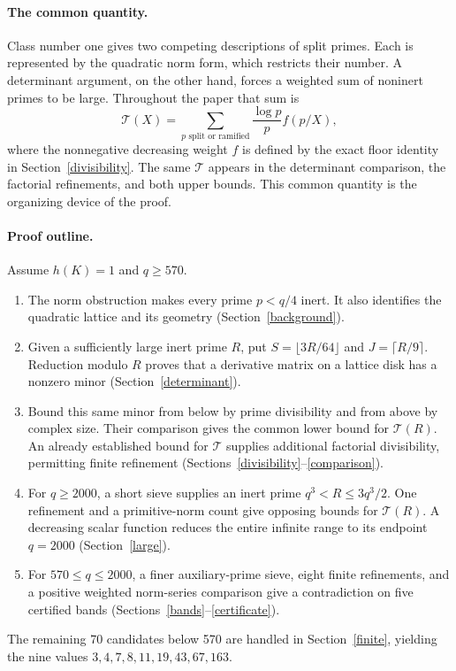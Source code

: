 \documentclass[11pt]{article}
\newcommand{\Tn}{\mathcal T}
\begin{document}
\paragraph{The common quantity.}
Class number one gives two competing descriptions of split primes.
Each is represented by the quadratic norm form, which restricts their
number. A determinant argument, on the other hand, forces a weighted
sum of noninert primes to be large. Throughout the paper that sum is
\[
 \Tn(X)=\sum_{p\text{ split or ramified}}\frac{\log p}{p}f(p/X),
\]
where the nonnegative decreasing weight \(f\) is defined by the exact
floor identity in Section~\ref{divisibility}. The same \(\Tn\) appears
in the determinant comparison, the factorial refinements, and both
upper bounds. This common quantity is the organizing device of the proof.

\paragraph{Proof outline.}
Assume \(h(K)=1\) and \(q\ge570\).
\begin{enumerate}
\item The norm obstruction makes every prime \(p<q/4\) inert.
It also identifies the quadratic lattice and its geometry
(Section~\ref{background}).
\item Given a sufficiently large inert prime \(R\), put
\(S=\lfloor3R/64\rfloor\) and \(J=\lceil R/9\rceil\).
Reduction modulo \(R\) proves that a derivative matrix on a lattice
disk has a nonzero minor (Section~\ref{determinant}).
\item Bound this same minor from below by prime divisibility and from
above by complex size. Their comparison gives the common lower bound
for \(\Tn(R)\). An already established bound for \(\Tn\) supplies
additional factorial divisibility, permitting finite refinement
(Sections~\ref{divisibility}--\ref{comparison}).
\item For \(q\ge2000\), a short sieve supplies an inert prime
\(q^3<R\le3q^3/2\). One refinement and a primitive-norm count give
opposing bounds for \(\Tn(R)\). A decreasing scalar function reduces
the entire infinite range to its endpoint \(q=2000\)
(Section~\ref{large}).
\item For \(570\le q\le2000\), a finer auxiliary-prime sieve,
eight finite refinements, and a positive weighted norm-series comparison
give a contradiction on five certified bands
(Sections~\ref{bands}--\ref{certificate}).
\end{enumerate}
The remaining 70 candidates below 570 are handled in
Section~\ref{finite}, yielding the nine values
\(3,4,7,8,11,19,43,67,163\).
\end{document}
